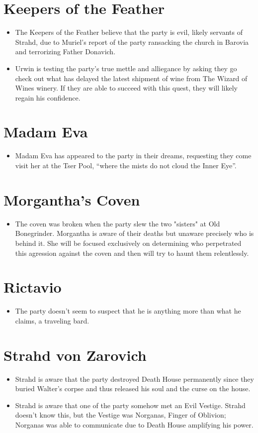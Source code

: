 \documentclass[a4paper,11pt]{article}
\begin{document}
\section{Keepers of the Feather}
\begin{itemize}
  \item The Keepers of the Feather believe that the party is evil, likely servants of Strahd, due to Muriel's 
  report of the party ransacking the church in Barovia and terrorizing Father Donavich.
  \item Urwin is testing the party's true mettle and alliegance by asking they go check out what has delayed the
  latest shipment of wine from The Wizard of Wines winery. If they are able to succeed with this quest, they
  will likely regain his confidence.
\end{itemize}

\section{Madam Eva}
\begin{itemize}
  \item Madam Eva has appeared to the party in their dreams, requesting they come visit her at the Tser Pool, 
  ``where the mists do not cloud the Inner Eye''.
\end{itemize}

\section{Morgantha's Coven}
\begin{itemize}
  \item The coven was broken when the party slew the two "sisters" at Old Bonegrinder. Morgantha is aware of their
  deaths but unaware precisely who is behind it. She will be focused exclusively on determining who perpetrated
  this agression against the coven and then will try to haunt them relentlessly.
\end{itemize}

\section{Rictavio}
\begin{itemize}
  \item The party doesn't seem to suspect that he is anything more than what he claims, a traveling bard.
\end{itemize}

\section{Strahd von Zarovich}
\begin{itemize}
  \item Strahd is aware that the party destroyed Death House permanently since they buried Walter's corpse and 
  thus released his soul and the curse on the house.
  \item Strahd is aware that one of the party somehow met an Evil Vestige. Strahd doesn't know this, but the 
  Vestige was Norganas, Finger of Oblivion; Norganas was able to communicate due to Death House amplifying his 
  power.
\end{itemize}
\end{document}
